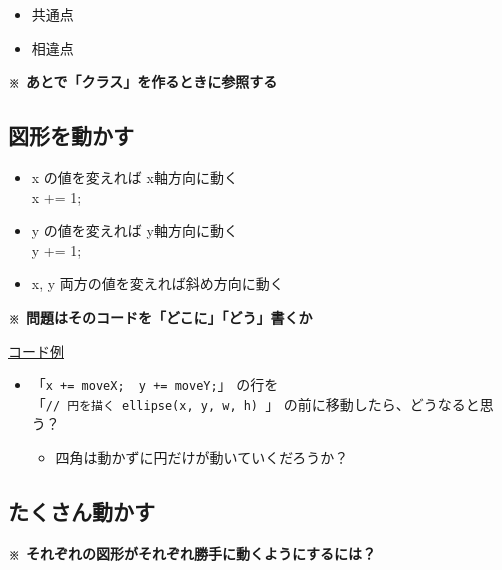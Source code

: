 \documentclass[uplatex,a4j,11pt]{jsarticle}
\begin{document}
\begin{itemize}
 \item 共通点
       \vspace*{3zw}
 \item 相違点
       \vspace*{3zw}
\end{itemize}

{\bfseries ※ あとで「クラス」を作るときに参照する}

\subsection{図形を動かす}

\begin{itemize}
 \item x の値を変えれば x軸方向に動く\\
       \hspace{2zw} x += 1;

 \item y の値を変えれば y軸方向に動く\\
       \hspace{2zw} y += 1;

 \item x, y 両方の値を変えれば斜め方向に動く
\end{itemize}

{\bfseries ※ 問題はそのコードを「どこに」「どう」書くか}

\href{prim01.txt}{コード例}

\begin{itemize}
 \item 「\verb|x += moveX;  y += moveY;|」 の行を \\
       「\verb|// 円を描く ellipse(x, y, w, h) |」
       の前に移動したら、どうなると思う？
       \begin{itemize}
        \item 四角は動かずに円だけが動いていくだろうか？
       \end{itemize}
\end{itemize}

\subsection{たくさん動かす}
\label{たくさん動かす}

{\bfseries ※ それぞれの図形がそれぞれ勝手に動くようにするには？}
\end{document}
